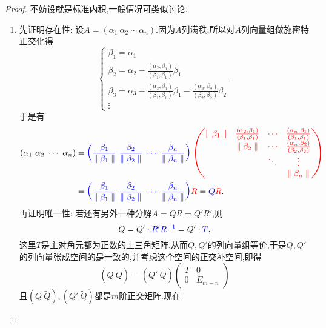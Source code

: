 \documentclass[../../main.tex]{subfiles}
\begin{document}
\begin{proof}
不妨设就是标准内积,一般情况可类似讨论.
\begin{enumerate}
\item 先证明存在性: 设\( A = (\alpha_1\ \alpha_2\ \cdots\ \alpha_n) \).因为\( A \)列满秩,所以对\( A \)列向量组做施密特正交化得
\[
\begin{cases}
\beta_1 = \alpha_1 \\
\beta_2 = \alpha_2 - \frac{(\alpha_2, \beta_1)}{(\beta_1, \beta_1)} \beta_1 \\
\beta_3 = \alpha_3 - \frac{(\alpha_3, \beta_1)}{(\beta_1, \beta_1)} \beta_1 - \frac{(\alpha_3, \beta_2)}{(\beta_2, \beta_2)} \beta_2 \\
\vdots
\end{cases}.
\]
于是有
\begin{align*}
(\alpha _1\,\,\alpha _2\,\,\cdots \,\,\alpha _n)&={\color{blue} \left( \frac{\beta _1}{\parallel \beta _1\parallel}\,\,\frac{\beta _2}{\parallel \beta _2\parallel}\,\,\cdots \,\,\frac{\beta _n}{\parallel \beta _n\parallel} \right) {\color{red} \left( \begin{matrix}
\parallel \beta _1\parallel&		\frac{\left( \alpha _2,\beta _1 \right)}{\left( \beta _1,\beta _1 \right)}&		\cdots&		\frac{\left( \alpha _n,\beta _1 \right)}{\left( \beta _1,\beta _1 \right)}\\
&		\parallel \beta _2\parallel&		\cdots&		\frac{\left( \alpha _n,\beta _2 \right)}{\left( \beta _2,\beta _2 \right)}\\
&		&		\ddots&		\vdots\\
&		&		&		\parallel \beta _n\parallel\\
\end{matrix} \right)}}
\\
&={\color{blue} \left( \frac{\beta _1}{\parallel \beta _1\parallel}\,\,\frac{\beta _2}{\parallel \beta _2\parallel}\,\,\cdots \,\,\frac{\beta _n}{\parallel \beta _n\parallel} \right) }{\color{red} R}={\color{blue} Q}{\color{red} R}.
\end{align*}
再证明唯一性: 若还有另外一种分解\( A = QR = Q' R' \),则
\[
Q = Q' \cdot {\color{blue} R' R^{-1}} = Q' \cdot {\color{blue} T},
\]
这里\( T \)是主对角元都为正数的上三角矩阵.从而\( Q, Q' \)的列向量组等价,于是\( Q, Q' \)的列向量张成空间的是一致的,并考虑这个空间的正交补空间,即得
\[
(Q\ \widetilde{Q}) = (Q'\ \widetilde{Q}) \begin{pmatrix} T & 0 \\ 0 & E_{m - n} \end{pmatrix}
\]
且\( (Q\ \widetilde{Q}), (Q'\ \widetilde{Q}) \)都是\( m \)阶正交矩阵.现在

\end{enumerate}
\end{proof}
\end{document}
